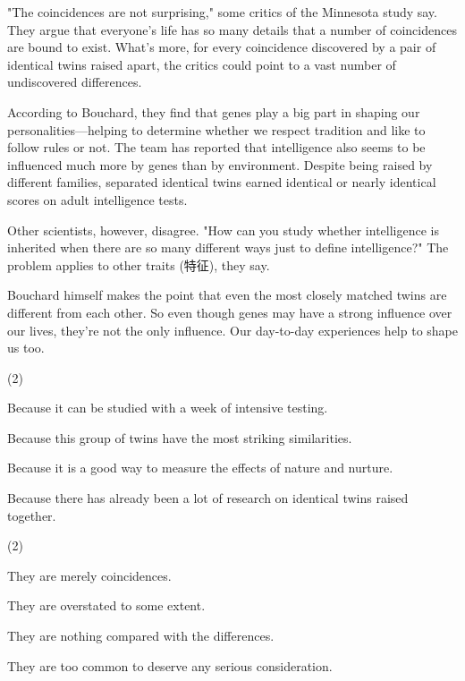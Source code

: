 \documentclass{英语试卷}
\begin{document}
\par "The coincidences are not surprising," some critics of the Minnesota study say. They argue that everyone's life has so many details that a number of coincidences are bound to exist. What's more, for every coincidence discovered by a pair of identical twins raised apart, the critics could point to a vast number of undiscovered differences.\par
\par According to Bouchard, they find that genes play a big part in shaping our personalities—helping to determine whether we respect tradition and like to follow rules or not. The team has reported that intelligence also seems to be influenced much more by genes than by environment. Despite being raised by different families, separated identical twins earned identical or nearly identical scores on adult intelligence tests.\par
\par Other scientists, however, disagree. "How can you study whether intelligence is inherited when there are so many different ways just to define intelligence?" The problem applies to other traits (特征), they say.\par
\par Bouchard himself makes the point that even the most closely matched twins are different from each other. So even though genes may have a strong influence over our lives, they're not the only influence. Our day-to-day experiences help to shape us too.\par
{}
\begin{choices}(2)
  \item Because it can be studied with a week of intensive testing.
  \item Because this group of twins have the most striking similarities.
  \item Because it is a good way to measure the effects of nature and nurture.
  \item Because there has already been a lot of research on identical twins raised together.
\end{choices}
\begin{choices}(2)
  \item They are merely coincidences.
  \item They are overstated to some extent.
  \item They are nothing compared with the differences.
  \item They are too common to deserve any serious consideration.
\end{choices}
\end{document}
